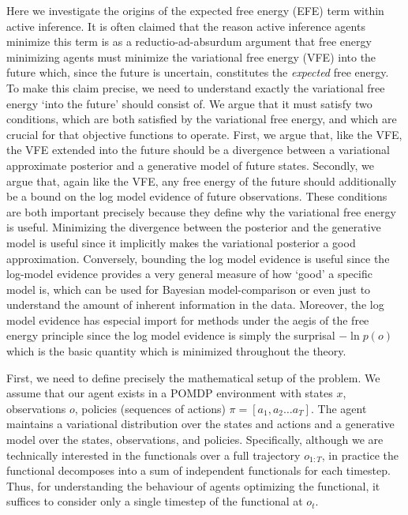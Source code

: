 Here we investigate the origins of the expected free energy (EFE) term within active inference. It is often claimed that the reason active inference agents minimize this term is as a reductio-ad-absurdum argument that free energy minimizing agents must minimize the variational free energy (VFE) into the future which, since the future is uncertain, constitutes the \emph{expected} free energy. To make this claim precise, we need to understand exactly the variational free energy `into the future' should consist of. We argue that it must satisfy two conditions, which are both satisfied by the variational free energy, and which are crucial for that objective functions to operate. First, we argue that, like the VFE, the VFE extended into the future should be a divergence between a variational approximate posterior and a generative model of future states. Secondly, we argue that, again like the VFE, any free energy of the future should additionally be a bound on the log model evidence of future observations. These conditions are both important precisely because they define why the variational free energy is useful. Minimizing the divergence between the posterior and the generative model is useful since it implicitly makes the variational posterior a good approximation. Conversely, bounding the log model evidence is useful since the log-model evidence provides a very general measure of how `good' a specific model is, which can be used for Bayesian model-comparison or even just to understand the amount of inherent information in the data. Moreover, the log model evidence has especial import for methods under the aegis of the free energy principle since the log model evidence is simply the surprisal $-\ln p(o)$ which is the basic quantity which is minimized throughout the theory.

First, we need to define precisely the mathematical setup of the problem. We assume that our agent exists in a POMDP environment with states $x$, observations $o$, policies (sequences of actions) $\pi = [a_1, a_2 \dots a_T]$. The agent maintains a variational distribution over the states and actions and a generative model over the states, observations, and policies. Specifically, although we are technically interested in the functionals over a full trajectory $o_{1:T}$, in practice the functional decomposes into a sum of independent functionals for each timestep. Thus, for understanding the behaviour of agents optimizing the functional, it suffices to consider only a single timestep of the functional at $o_t$.

